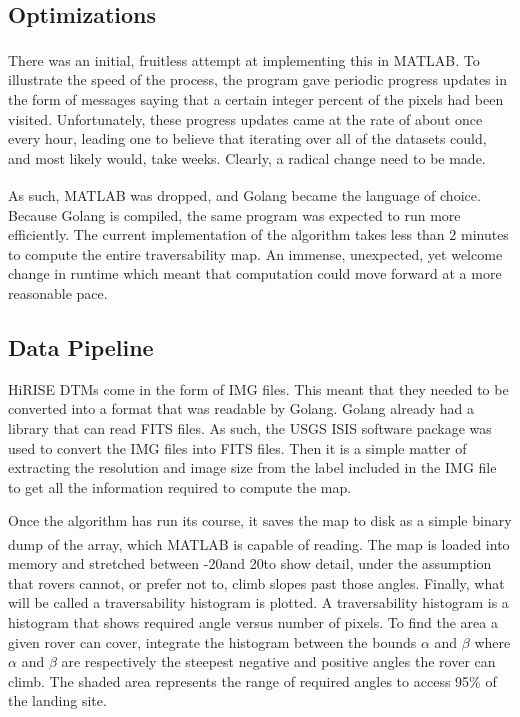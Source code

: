 \documentclass[12pt]{article}
\newcommand{\MATLAB}{MATLAB\textsuperscript{\textregistered}}
\begin{document}
\subsection{Optimizations}
\label{sub:optimizations}
\par There was an initial, fruitless attempt at implementing this in \MATLAB{}. To illustrate the speed of the process, the program gave periodic progress updates in the form of messages saying that a certain integer percent of the pixels had been visited. Unfortunately, these progress updates came at the rate of about once every hour, leading one to believe that iterating over all of the datasets could, and most likely would, take weeks. Clearly, a radical change need to be made.
\par As such, \MATLAB{} was dropped, and Golang became the language of choice. Because Golang is compiled, the same program was expected to run more efficiently. The current implementation of the algorithm takes less than 2 minutes to compute the entire traversability map. An immense, unexpected, yet welcome change in runtime which meant that computation could move forward at a more reasonable pace.

\subsection{Data Pipeline}
\label{sub:data_pipeline}
\par HiRISE DTMs come in the form of IMG files. This meant that they needed to be converted into a format that was readable by Golang. Golang already had a library that can read FITS files. As such, the USGS ISIS software package was used to convert the IMG files into FITS files. Then it is a simple matter of extracting the resolution and image size from the label included in the IMG file to get all the information required to compute the map.
\par Once the algorithm has run its course, it saves the map to disk as a simple binary dump of the array, which \MATLAB{} is capable of reading. The map is loaded into memory and stretched between -20\textdegree and 20\textdegree to show detail, under the assumption that rovers cannot, or prefer not to, climb slopes past those angles. Finally, what will be called a traversability histogram is plotted. A traversability histogram is a histogram that shows required angle versus number of pixels. To find the area a given rover can cover, integrate the histogram between the bounds $\alpha$ and $\beta$ where $\alpha$ and $\beta$ are respectively the steepest negative and positive angles the rover can climb. The shaded area represents the range of required angles to access 95\% of the landing site.
\end{document}
